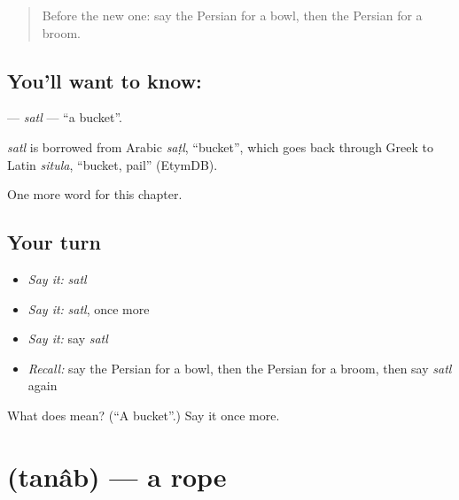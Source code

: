 \label{lesson:FA-C111-satl}



\begin{quote}
Before the new one: say the Persian for a bowl, then the Persian for a broom.
\end{quote}

\subsection*{You'll want to know: }
\textbf{} — \emph{satl} — \textquotedblleft{}a bucket\textquotedblright{}.

\begin{cousinweb}
\emph{satl} is borrowed from Arabic \emph{saṭl}, \textquotedblleft{}bucket\textquotedblright{}, which goes back through Greek to Latin \emph{situla}, \textquotedblleft{}bucket, pail\textquotedblright{} (EtymDB).
\end{cousinweb}

\begin{grammarlens}[title={What you've built}]
One more word for this chapter.
\end{grammarlens}

\subsection*{Your turn}
\begin{itemize}
\raggedright
  \item \emph{Say it:} \emph{satl}
  \item \emph{Say it:} \emph{satl}, once more
  \item \emph{Say it:} say \emph{satl}
  \item \emph{Recall:} say the Persian for a bowl, then the Persian for a broom, then say \emph{satl} again
\end{itemize}

\begin{tcolorbox}[breakable,colback=teal!4,colframe=teal!35!black,title={Before you move on}]
What does  mean? (\textquotedblleft{}A bucket\textquotedblright{}.) Say it once more.
\end{tcolorbox}
\section[\texorpdfstring{\fa{طناب} (tanâb)}{طناب (tanâb)}]{ (tanâb) — a rope}

\label{lesson:FA-C111-tanab}



